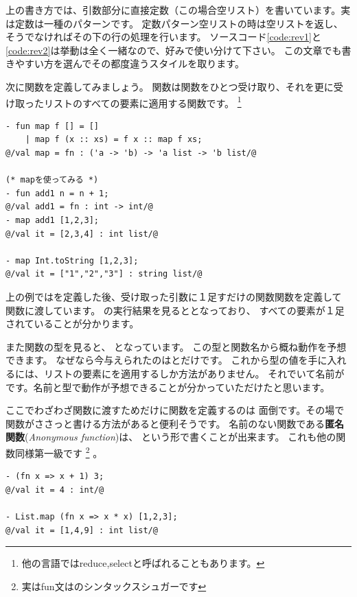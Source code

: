 \documentclass[11pt,a4paper]{jarticle}
\begin{document}
上の書き方では、引数部分に直接定数（この場合空リスト）を書いています。実は定数は一種のパターンです。
定数パターン空リストの時は空リストを返し、そうでなければその下の行の処理を行います。
ソースコード\ref{code:rev1}と\ref{code:rev2}は挙動は全く一緒なので、好みで使い分けて下さい。
この文章でも書きやすい方を選んでその都度違うスタイルを取ります。

次に関数を定義してみましょう。
関数は関数をひとつ受け取り、それを更に受け取ったリストのすべての要素に適用する関数です。
\footnote{他の言語ではreduce,selectと呼ばれることもあります。}

\begin{lstlisting}[caption=関数fとリストlを受け取り、lの要素全てにfを適用する関数, label=code:map]
- fun map f [] = []
    | map f (x :: xs) = f x :: map f xs;
@/val map = fn : ('a -> 'b) -> 'a list -> 'b list/@

(* mapを使ってみる *)
- fun add1 n = n + 1;
@/val add1 = fn : int -> int/@
- map add1 [1,2,3];
@/val it = [2,3,4] : int list/@

- map Int.toString [1,2,3];
@/val it = ["1","2","3"] : string list/@
\end{lstlisting}

上の例ではを定義した後、受け取った引数に１足すだけの関数関数を定義して
関数に渡しています。
の実行結果を見ると\prog{[2,3,4]}となっており、
すべての要素が１足されていることが分かります。

また関数の型を見ると、
となっています。
この型と関数名から概ね動作を予想できます。
なぜなら今与えられたのはとだけです。
これから型の値を手に入れるには、リストの要素にを適用するしか方法がありません。
それでいて名前がです。名前と型で動作が予想できることが分かっていただけたと思います。

ここでわざわざ関数に渡すためだけに関数を定義するのは
面倒です。その場で関数がささっと書ける方法があると便利そうです。
名前のない関数である{\bfseries 匿名関数}({\itshape Anonymous function})は、
という形で書くことが出来ます。
これも他の関数同様第一級です
\footnote{実はfun文はのシンタックスシュガーです}
。

\begin{lstlisting}[caption=匿名関数,label=code:anonymous]
- (fn x => x + 1) 3;
@/val it = 4 : int/@

- List.map (fn x => x * x) [1,2,3];
@/val it = [1,4,9] : int list/@
\end{lstlisting}
\end{document}
